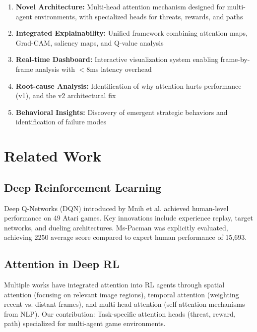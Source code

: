 \documentclass[11pt,a4paper]{article}
\begin{document}
\begin{enumerate}
    \item \textbf{Novel Architecture:} Multi-head attention mechanism designed for multi-agent environments, with specialized heads for threats, rewards, and paths
    
    \item \textbf{Integrated Explainability:} Unified framework combining attention maps, Grad-CAM, saliency maps, and Q-value analysis
    
    \item \textbf{Real-time Dashboard:} Interactive visualization system enabling frame-by-frame analysis with $<8$ms latency overhead
    
    \item \textbf{Root-cause Analysis:} Identification of why attention hurts performance (v1), and the v2 architectural fix
    
    \item \textbf{Behavioral Insights:} Discovery of emergent strategic behaviors and identification of failure modes
\end{enumerate}

\section{Related Work}

\subsection{Deep Reinforcement Learning}

Deep Q-Networks (DQN) introduced by Mnih et al. achieved human-level performance on 49 Atari games. Key innovations include experience replay, target networks, and dueling architectures. Ms-Pacman was explicitly evaluated, achieving 2250 average score compared to expert human performance of 15,693.

\subsection{Attention in Deep RL}

Multiple works have integrated attention into RL agents through spatial attention (focusing on relevant image regions), temporal attention (weighting recent vs. distant frames), and multi-head attention (self-attention mechanisms from NLP). Our contribution: Task-specific attention heads (threat, reward, path) specialized for multi-agent game environments.
\end{document}
